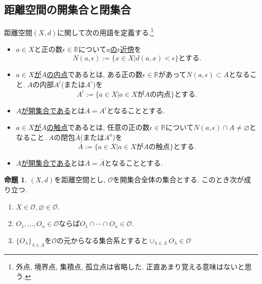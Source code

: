 \documentclass[dvipdfmx,a4paper,11pt]{article}
\newcommand{\R}{\mathbb{R}}
\theoremstyle{definition}
\newtheorem{prop}[thm]{命題}
\begin{document}
 \subsection{距離空間の開集合と閉集合}
 距離空間$(X,d)$に関して次の用語を定義する.\footnote{外点, 境界点, 集積点, 孤立点は省略した. 正直あまり覚える意味はないと思う.}
 \begin{itemize}
 \setlength{\parskip}{0cm} 
  \setlength{\itemsep}{0cm} 
 \item $a \in X$と正の数$\epsilon \in \R$について\underline{$a$の$\epsilon$近傍}を
 $$
 N(a,\epsilon) := \{ x \in X  | d(a,x) < \epsilon \} \text{とする.}
 $$
 \item \underline{$a \in X$が$A$の内点}であるとは, ある正の数$\epsilon \in \R$があって$ N(a,\epsilon) \subset A$となること. $A$の内部$A^i$(または$A^{\circ}$)を
$$
A^i := \{a \in X  | \text{$a \in X$が$A$の内点}\}  \text{とする.}
$$
\item \underline{$A$が開集合である}とは$A = A^i$となることとする.
 \item \underline{$a \in X$が$A$の触点}であるとは, 任意の正の数$\epsilon \in \R$について$ N(a,\epsilon) \cap A \neq \varnothing$となること. $A$の閉包$\overline{A}$(または$A^a$)を
$$
\overline{A} := \{a \in X  | \text{$a \in X$が$A$の触点}\}  \text{とする.}
$$
\item \underline{$A$が開集合である}とは$A = \overline{A}$となることとする.
 \end{itemize}
 
\begin{tcolorbox}[
    colback = white,
    colframe = green!35!black,
    fonttitle = \bfseries,
    breakable = true]
    \begin{prop}
    \text{}
    $(X,d)$を距離空間とし, $\mathscr{O}$を開集合全体の集合とする. このとき次が成り立つ.
    \begin{enumerate}
     \setlength{\parskip}{0cm} 
  \setlength{\itemsep}{0cm} 
    \item $X \in \mathscr{O}, \varnothing \in \mathscr{O}$.
    \item $O_1, \ldots, O_n \in \mathscr{O}$ならば$O_1 \cap \cdots \cap O_n \in \mathscr{O}$.
    \item $\{ O_{\lambda} \}_{\lambda \in \Lambda }$を$\mathscr{O}$の元からなる集合系とすると$
    \cup_{ \lambda \in \Lambda  }O_{\lambda} \in \mathscr{O}$
    \end{enumerate}
  \end{prop}
 \end{tcolorbox}
 
\end{document}
